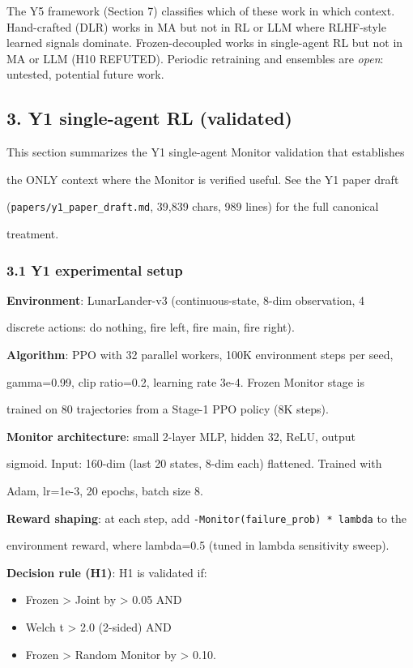 \documentclass[11pt]{article}
\begin{document}
The Y5 framework (Section 7) classifies which of these work in which
context. Hand-crafted (DLR) works in MA but not in RL or LLM where
RLHF-style learned signals dominate. Frozen-decoupled works in
single-agent RL but not in MA or LLM (H10 REFUTED). Periodic retraining
and ensembles are \emph{open}: untested, potential future work.

\subsection{3. Y1 single-agent RL
(validated)}\label{y1-single-agent-rl-validated}

This section summarizes the Y1 single-agent Monitor validation that
establishes

the ONLY context where the Monitor is verified useful. See the Y1 paper
draft

(\texttt{papers/y1\_paper\_draft.md}, 39,839 chars, 989 lines) for the
full canonical

treatment.

\subsubsection{3.1 Y1 experimental setup}\label{y1-experimental-setup}

\textbf{Environment}: LunarLander-v3 (continuous-state, 8-dim
observation, 4

discrete actions: do nothing, fire left, fire main, fire right).

\textbf{Algorithm}: PPO with 32 parallel workers, 100K environment steps
per seed,

gamma=0.99, clip ratio=0.2, learning rate 3e-4. Frozen Monitor stage is

trained on 80 trajectories from a Stage-1 PPO policy (8K steps).

\textbf{Monitor architecture}: small 2-layer MLP, hidden 32, ReLU,
output

sigmoid. Input: 160-dim (last 20 states, 8-dim each) flattened. Trained
with

Adam, lr=1e-3, 20 epochs, batch size 8.

\textbf{Reward shaping}: at each step, add
\texttt{-Monitor(failure\_prob)\ *\ lambda} to the

environment reward, where lambda=0.5 (tuned in lambda sensitivity
sweep).

\textbf{Decision rule (H1)}: H1 is validated if:

\begin{itemize}
\item
  Frozen \textgreater{} Joint by \textgreater{} 0.05 AND
\item
  Welch t \textgreater{} 2.0 (2-sided) AND
\item
  Frozen \textgreater{} Random Monitor by \textgreater{} 0.10.
\end{itemize}
\end{document}
